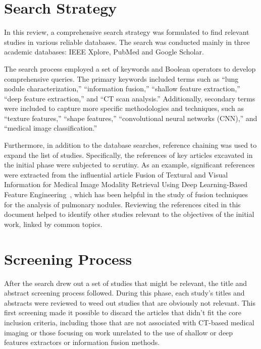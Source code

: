 \section{Search Strategy}

In this review, a comprehensive search strategy was formulated to find relevant studies in various reliable databases. The search was conducted mainly in three academic databases: IEEE Xplore, PubMed and Google Scholar.

The search process employed a set of keywords and Boolean operators to develop comprehensive queries. The primary keywords included terms such as “lung nodule characterization,” “information fusion,” “shallow feature extraction,” “deep feature extraction,” and “CT scan analysis.” Additionally, secondary terms were included to capture more specific methodologies and techniques, such as “texture features,” “shape features,” “convolutional neural networks (CNN),” and “medical image classification.”

Furthermore, in addition to the database searches, reference chaining was used to expand the list of studies. Specifically, the references of key articles excavated in the initial phase were subjected to scrutiny. As an example, significant references were extracted from the influential article Fusion of Textural and Visual Information for Medical Image Modality Retrieval Using Deep Learning-Based Feature Engineering~\cite{Iqbal2023}, which has been helpful in the study of fusion techniques for the analysis of pulmonary nodules. Reviewing the references cited in this document helped to identify other studies relevant to the objectives of the initial work, linked by common topics.



\section{Screening Process}

After the search drew out a set of studies that might be relevant, the title and abstract screening process followed. During this phase, each study's titles and abstracts were reviewed to weed out studies that are obviously not relevant. This first screening made it possible to discard the articles that didn't fit the core inclusion criteria, including those that are not associated with CT-based medical imaging or those focusing on work unrelated to the use of shallow or deep features extractors or information fusion methods.


